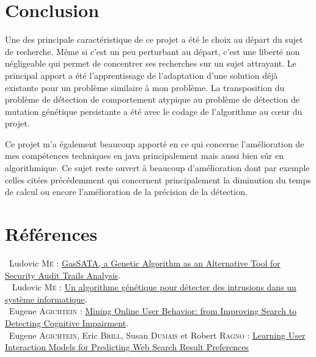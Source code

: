\documentclass[a4paper, 11pt]{article}
\begin{document}
\newpage
\section*{{\LARGE Conclusion}}
\vspace{1cm}


Une des principale caractéristique de ce projet a été le choix au départ du sujet de recherche. Même si c'est un peu perturbant au départ, c'est une liberté non négligeable qui permet de concentrer ses recherches sur un sujet attrayant. Le principal apport a été l'apprentissage de l'adaptation d'une solution déjà existante pour un problème similaire à mon problème. La transposition du problème de détection de comportement atypique au problème de détection de mutation génétique persistante a été avec le codage de l'algorithme au c\oe ur du projet.

Ce projet m'a également beaucoup apporté en ce qui concerne l'amélioration de mes compétences techniques en java principalement mais aussi bien sûr en algorithmique. Ce sujet reste ouvert à beaucoup d'amélioration dont par exemple celles citées précédemment qui concernent principalement la diminution du temps de calcul ou encore l'amélioration de la précision de la détection.


\newpage
\section*{{\LARGE Références}}
\vspace{1cm}


\noindent [1]~Ludovic M\textsc{é} :  \href{http://www.rennes.supelec.fr/ren/perso/lme/PUBLI/raid98.pdf}{GasSATA, a Genetic Algorithm as an Alternative Tool for Security Audit Trails Analysis}. \\

\noindent [2]~ Ludovic M\textsc{é} :  \href{http://www.rennes.supelec.fr/rennes/si/equipe/lme/PUBLI/valgo95.pdf}{Un algorithme génétique pour détecter des intrusions dans
un système informatique}.\\

\noindent [3]~Eugene A\textsc{gichtein} : \href{http://www.cse.lehigh.edu/academics/graduate-programs/graduate-computer-engineering/2-uncategorised/235-agichtein}{Mining Online User Behavior: from Improving Search to Detecting Cognitive Impairment}.\\

\noindent [4]~Eugene A\textsc{gichtein}, Eric B\textsc{rill}, Susan D\textsc{umais} et Robert R\textsc{agno} : \href{http://research.microsoft.com/pubs/68153/sigir2006-fp338-preferences-agichtein.pdf}{Learning User Interaction Models for Predicting Web Search Result Preferences}
\end{document}
